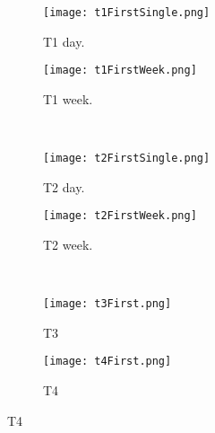 \begin{figure}[!h]
  \centering
  \begin{subfigure}[b]{0.45\textwidth}
    \centering
    \texttt{[image: t1FirstSingle.png]}
    \caption{T1 day.}
  \end{subfigure}
  \begin{subfigure}[b]{0.45\textwidth}
    \centering
    \texttt{[image: t1FirstWeek.png]}
    \caption{T1 week.}
  \end{subfigure}
  \\
  \begin{subfigure}[b]{0.45\textwidth}
    \centering
    \texttt{[image: t2FirstSingle.png]}
    \caption{T2 day.}
  \end{subfigure}
  \begin{subfigure}[b]{0.45\textwidth}
    \centering
    \texttt{[image: t2FirstWeek.png]}
    \caption{T2 week.}
  \end{subfigure}
  \\
  \begin{subfigure}[b]{0.45\textwidth}
    \centering
    \texttt{[image: t3First.png]}
    \caption{T3}
  \end{subfigure}
  \begin{subfigure}[b]{0.45\textwidth}
    \centering
    \texttt{[image: t4First.png]}
    \caption{T4}
  \end{subfigure}
  \label{fig:tFirst}
\end{figure}  
